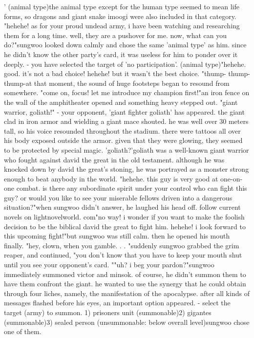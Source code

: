' (animal type)the animal type except for the human type seemed to mean life forms, so dragons and giant snake imoogi were also included in that category.
"hehehe! as for your proud undead army, i have been watching and researching them for a long time.
 well, they are a pushover for me.
 now, what can you do?"sungwoo looked down calmly and chose the same 'animal type' as him.
 since he didn't know the other party's card, it was useless for him to ponder over it deeply.
- you have selected the target of 'no participation'.
 (animal type)"hehehe.
 good.
 it's not a bad choice! hehehe! but it wasn't the best choice.
"thump- thump- thump-at that moment, the sound of huge footsteps began to resound from somewhere.
"come on, focus! let me introduce my champion first!"an iron fence on the wall of the amphitheater opened and something heavy stepped out.
"giant warrior, goliath!"
- your opponent, 'giant fighter goliath' has appeared.
the giant clad in iron armor and wielding a giant mace shouted.
he was well over 30 meters tall, so his voice resounded throughout the stadium.
 there were tattoos all over his body exposed outside the armor.
 given that they were glowing, they seemed to be protected by special magic.
'goliath?'goliath was a well-known giant warrior who fought against david the great in the old testament.
 although he was knocked down by david the great's stoning, he was portrayed as a monster strong enough to beat anybody in the world.
"hehehe.
 this guy is very good at one-on-one combat.
 is there any subordinate spirit under your control who can fight this guy? or would you like to see your miserable fellows driven into a dangerous situation?"when sungwoo didn't answer, he laughed his head off.
follow current novels on lightnov‌elworld.
c‌om"no way! i wonder if you want to make the foolish decision to be the biblical david the great to fight him.
 hehehe! i look forward to this upcoming fight!"but sungwoo was still calm.
 then he opened his mouth finally.
"hey, clown, when you gamble.
.
.
"suddenly sungwoo grabbed the grim reaper, and continued, "you don't know that you have to keep your mouth shut until you see your opponent's card.
""uh? i beg your pardon?"sungwoo immediately summoned victor and minsok.
 of course, he didn't summon them to have them confront the giant.
 he wanted to use the synergy that he could obtain through four liches, namely, the manifestation of the apocalypse.
after all kinds of messages flashed before his eyes, an important option appeared.
- select the target (army) to summon.
1) prisoners unit (summonable)2) gigantes (summonable)3) sealed person (unsummonable: below overall level)sungwoo chose one of them.
